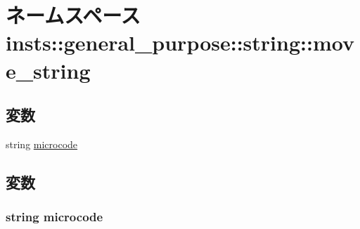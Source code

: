 \hypertarget{namespaceinsts_1_1general__purpose_1_1string_1_1move__string}{
\section{ネームスペース insts::general\_\-purpose::string::move\_\-string}
\label{namespaceinsts_1_1general__purpose_1_1string_1_1move__string}
}
\subsection*{変数}
\begin{DoxyCompactItemize}
\item 
string \hyperlink{namespaceinsts_1_1general__purpose_1_1string_1_1move__string_a770f11a173e99389a8802f0107ed8f52}{microcode}
\end{DoxyCompactItemize}


\subsection{変数}
\hypertarget{namespaceinsts_1_1general__purpose_1_1string_1_1move__string_a770f11a173e99389a8802f0107ed8f52}{
\subsubsection[{microcode}]{\setlength{\rightskip}{0pt plus 5cm}string {\bf microcode}}}
\label{namespaceinsts_1_1general__purpose_1_1string_1_1move__string_a770f11a173e99389a8802f0107ed8f52}
